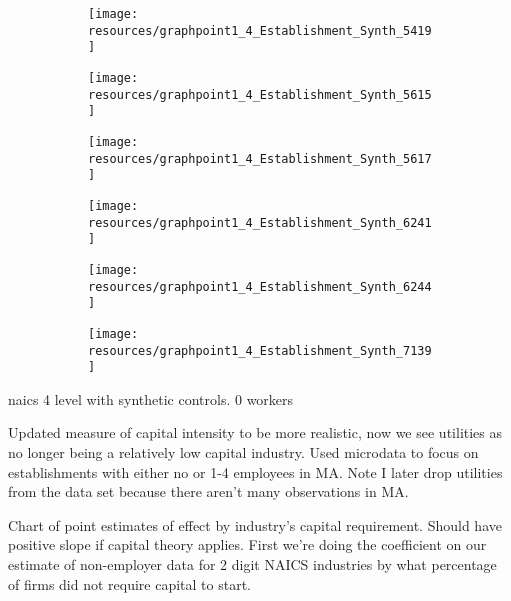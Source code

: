 \documentclass[12pt]{article}
\begin{document}
\begin{figure}[H]
	\centering
	\begin{subfigure}[b]{0.4\textwidth}
	    \texttt{[image: resources/graphpoint1\_4\_Establishment\_Synth\_5419]}
	\end{subfigure}
	\begin{subfigure}[b]{0.4\textwidth}
	    \texttt{[image: resources/graphpoint1\_4\_Establishment\_Synth\_5615]}
	\end{subfigure}
\end{figure}
\begin{figure}[H]
	\centering
	\begin{subfigure}[b]{0.4\textwidth}
	    \texttt{[image: resources/graphpoint1\_4\_Establishment\_Synth\_5617]}
	\end{subfigure}
	\begin{subfigure}[b]{0.4\textwidth}
	    \texttt{[image: resources/graphpoint1\_4\_Establishment\_Synth\_6241]}
	\end{subfigure}
\end{figure}

\begin{figure}[H]
	\centering
	\begin{subfigure}[b]{0.4\textwidth}
	    \texttt{[image: resources/graphpoint1\_4\_Establishment\_Synth\_6244]}
	\end{subfigure}
	\begin{subfigure}[b]{0.4\textwidth}
	    \texttt{[image: resources/graphpoint1\_4\_Establishment\_Synth\_7139]}
	\end{subfigure}
\end{figure}

\pagebreak

naics 4 level with synthetic controls. 0 workers

\pagebreak

\pagebreak

Updated measure of capital intensity to be more realistic, now we see utilities as no longer being a relatively low capital industry. Used microdata to focus on establishments with either no or 1-4 employees in MA. Note I later drop utilities from the data set because there aren't many observations in MA. 



\pagebreak

Chart of point estimates of effect by industry's capital requirement. Should have positive slope if capital theory applies. First we're doing the coefficient on our estimate of non-employer data for 2 digit NAICS industries by what percentage of firms did not require capital to start. 
\end{document}
